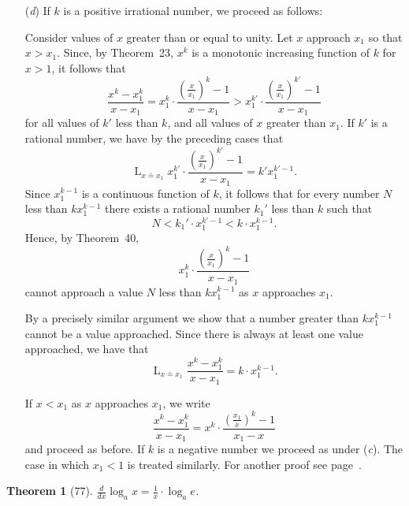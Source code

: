 \documentclass[a4paper,12pt]{book}[2004/02/16]
\providecommand{\hyperlink}[2]{#2}
\providecommand{\hypertarget}[2]{#2}
\theoremstyle{ilemma}
\theoremstyle{itheorem}
\newtheorem{theorem}{Theorem}
\theoremstyle{iother}
\theoremstyle{icorollary}
\theoremstyle{numcorollary}
\theoremstyle{idefinition}
\renewcommand{\dfrac}[2]{\frac{#1}{#2}}%
\begin{document}
\begin{enumerate}
\item[(\textit{d})] If $k$ is a positive irrational number, we proceed
as follows:

Consider values of $x$ greater than or equal to unity. Let $x$
approach $x_1$ so that $x>x_1$. Since, by Theorem~\hyperlink{thm23}{23}, $x^k$ is a
monotonic increasing function of $k$ for $x > 1$, it follows that
\[
  \frac{x^k-x_1^k}{x-x_1}
= x_1^k \cdot \frac{\left(\dfrac{x}{x_1}\right)^k-1}{x-x_1}
> x_1^{k'} \cdot \frac{\left(\dfrac{x}{x_1}\right)^{k'}-1}{x-x_1}
\]
for all values of $k'$ less than $k$, and all values of $x$ greater
than $x_1$.  If $k'$ is a rational number, we have by the preceding
cases that
\[
  \mathop{L}_{x\doteq x_1}
  x_1^{k'} \cdot \frac{\left(\dfrac{x}{x_1}\right)^{k'}-1}{x-x_1}
= k'x_1^{k'-1}.
\]
Since $x_1^{k-1}$ is a continuous function of $k$, it follows that for
every number $N$ less than $kx_1^{k-1}$ there exists a rational number
$k_1'$ less than $k$ such that
\[
  N < k_1'\cdot x_1^{k'-1} < k\cdot x_1^{k-1}.
\]
Hence, by Theorem~\hyperlink{thm40}{40},
\[
  x_1^k \cdot \frac{\left(\dfrac{x}{x_1}\right)^k-1}{x-x_1}
\]
cannot approach a value $N$ less than $kx_1^{k-1}$ as $x$ approaches $x_1$.

By a precisely similar argument we show that a number greater than
$kx_1^{k-1}$ cannot be a value approached. Since there is always at
least one value approached, we have that
\[
  \mathop{L}_{x\doteq x_1} \frac{x^k-x_1^k}{x-x_1} = k\cdot x_1^{k-1}.
\]

If $x<x_1$ as $x$ approaches $x_1$, we write
\[
  \frac{x^k-x_1^k}{x-x_1}
= x^k\cdot\frac{\left(\dfrac{x_1}{x}\right)^k-1}{x_1-x}
\]
and proceed as before. If $k$ is a negative number we proceed
as under (\textit{c}). The case in which $x_1 < 1$ is treated
similarly. For another proof see page~\pageref{pt76p127}.
\end{enumerate}

\begin{theorem}[77]\hypertarget{thm77}{}
$\dfrac{d}{dx}\log_a x = \dfrac{1}{x} \cdot \log_a e$.
\end{theorem}
\end{document}
